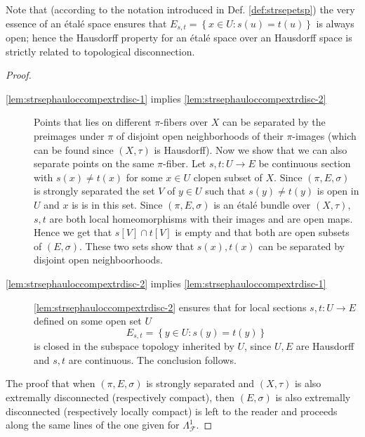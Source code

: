 \documentclass[11pt]{amsart}
\newcommand{\F}{\mathcal{F}}
\theoremstyle{plain}
\theoremstyle{definition}
\theoremstyle{plain}
\theoremstyle{remark}
\newcommand{\bp}[1]{\left\lbrace #1 \right\rbrace}
\newcommand{\0}{\mathsf{0}}
\renewcommand{\1}{\mathsf{1}}
\renewcommand{\2}{\mathsf{2}}
\theoremstyle{definition}
\begin{document}
Note that (according to the notation introduced in Def. \ref{def:strsepetsp}) the very essence of an \'etal\'e space ensures that $E_{s,t}=\bp{x\in U:s(u)=t(u)}$ is always open; hence the Hausdorff property for an \'etal\'e space over an Hausdorff space is strictly related to topological disconnection.

\begin{proof}
\emph{}

\begin{description}
\item[\ref{lem:strsephauloccompextrdisc-1} implies \ref{lem:strsephauloccompextrdisc-2}]
Points that lies on different $\pi$-fibers over $X$ can be separated by the preimages under $\pi$ of disjoint open neighborhoods of their $\pi$-images (which can be found since $(X,\tau)$ is Hausdorff). Now we show that we can also separate points on the same $\pi$-fiber.
Let  $s,t:U\to E$ be continuous section with $s(x)\neq t(x)$ for some $x\in U$ clopen subset of $X$.  Since $(\pi,E,\sigma)$ is strongly separated the set $V$ of $y\in U$ such that
$s(y)\neq t(y)$ is open in $U$ and $x$ is is in this set. Since $(\pi,E,\sigma)$ is an \'etal\'e bundle over $(X,\tau)$, $s,t$ are both local homeomorphisms with their images and are open maps. Hence we get that $s[V]\cap t[V]$ is empty and that both are open subsets of $(E,\sigma)$. These two sets show that $s(x),t(x)$ can be separated by disjoint open neighboorhoods.

\item[\ref{lem:strsephauloccompextrdisc-2} implies \ref{lem:strsephauloccompextrdisc-1}]
 \ref{lem:strsephauloccompextrdisc-2} ensures that for local sections $s,t:U\to E$ defined on some open set $U$
\[
E_{s,t}=\bp{y\in U: s(y)=t(y)}
\]
is closed in the subspace topology inherited by $U$, since $U,E$ are Hausdorff and $s,t$ are continuous. 
The conclusion follows.
\end{description}

The proof that when $(\pi,E,\sigma)$ is strongly separated and $(X,\tau)$ is also  extremally disconnected (respectively compact), then $(E,\sigma)$ is also extremally disconnected  (respectively locally compact) is left to the reader and proceeds along the same lines of the one given for $\Lambda^1_\F$.
\end{proof}
%
%
%
\end{document}
